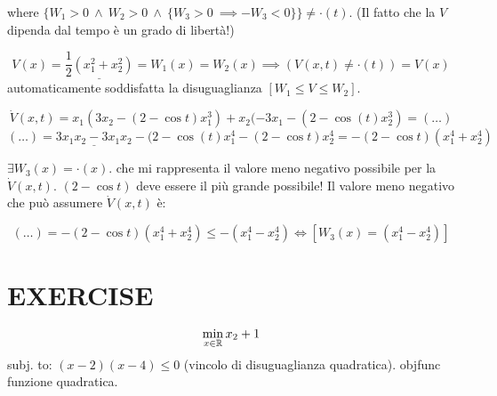 \begin{itemize}
where $\{W_1>0\ \land\ W_2>0\ \land\ \{W_3>0\ \implies -W_3<0\}\} \neq \mathord{\cdot}(t)$. (Il fatto che la $V$ dipenda dal tempo è un grado di libertà!)

\[
	V(x) = \underline{\frac{1}{2}(x_1^2+x_2^2)} = W_1(x) = W_2(x) \implies (V(x,t)\neq\mathord{\cdot}(t)) = V(x)
\]
automaticamente soddisfatta la disuguaglianza $[W_1\leq V\leq W_2]$.

\[
	\dot{V}(x,t) = x_1(3x_2-(2-\cos{t})x_1^3) + x_2(-3x_1 - (2-\cos{(t)}x_2^3) = (\dots)
\]
\[
	(\dots) = \underline{3x_1x_2-3x_1x_2} -(2-\cos{(t)}x_1^4 -(2-\cos{t})x_2^4 = -(2-\cos{t})(x_1^4+x_2^4)
\]

$\exists W_3(x) = \mathord{\cdot}(x)$. che mi rappresenta il valore meno negativo possibile per la $\dot{V}(x,t)$. $(2-\cos{t})$ deve essere il più grande possibile! Il valore meno negativo che può assumere $\dot{V}(x,t)$ è:

\[
	(\dots) = -(2-\cos{t})(x_1^4+x_2^4) \leq -(x_1^4-x_2^4) \iff [W_3(x)=(x_1^4-x_2^4)]
\]
	
\end{itemize}

\section{EXERCISE}

\[
	\min_{x\in\mathbb{R}}{x_2+1}
\]
subj. to: $(x-2)(x-4)\leq 0$ (vincolo di disuguaglianza quadratica).
objfunc funzione quadratica.

